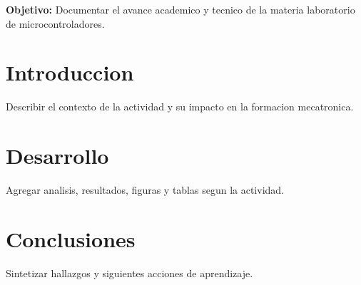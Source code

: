 \documentclass[spanish,letterpaper,oneside]{article}
\begin{document}
\templatePortrait
\templatePagecfg
\onehalfspacing

\begin{abstractd}
\textbf{Objetivo:} Documentar el avance academico y tecnico de la materia laboratorio de microcontroladores.
\end{abstractd}

\templateIndex
\templateFinalcfg

\section{Introduccion}
Describir el contexto de la actividad y su impacto en la formacion mecatronica.

\section{Desarrollo}
Agregar analisis, resultados, figuras y tablas segun la actividad.

\section{Conclusiones}
Sintetizar hallazgos y siguientes acciones de aprendizaje.



\end{document}
